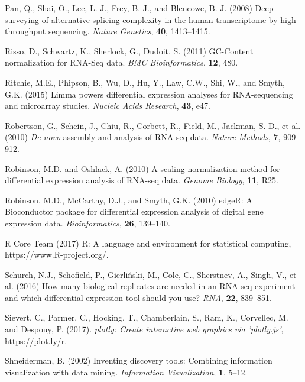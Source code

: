\documentclass{bioinfo}
\begin{document}
\begin{thebibliography}{}
Pan, Q., Shai, O., Lee, L. J., Frey, B. J., and Blencowe, B. J. (2008) Deep surveying of alternative splicing complexity in the human transcriptome by high-throughput sequencing. {\it Nature Genetics}, {\bf 40}, 1413--1415.

Risso, D., Schwartz, K., Sherlock, G., Dudoit, S. (2011) GC-Content normalization for RNA-Seq data. {\it BMC Bioinformatics}, {\bf 12}, 480.

Ritchie, M.E., Phipson, B., Wu, D., Hu, Y., Law, C.W., Shi, W., and Smyth, G.K. (2015) Limma powers differential expression analyses for RNA-sequencing and microarray studies. {\it Nucleic Acids Research}, {\bf 43}, e47.

Robertson, G., Schein, J., Chiu, R., Corbett, R., Field, M., Jackman, S. D., et al. (2010) \textit{De novo} assembly and analysis of RNA-seq data. {\it Nature Methods}, {\bf 7}, 909--912.

Robinson, M.D. and Oshlack, A. (2010) A scaling normalization method for differential expression analysis of RNA-seq data. {\it Genome Biology}, {\bf 11}, R25.

Robinson, M.D., McCarthy, D.J., and Smyth, G.K. (2010) edgeR: A Bioconductor package for differential expression analysis of digital gene expression data. {\it Bioinformatics}, {\bf 26}, 139--140.

R Core Team (2017) R: A language and environment for statistical computing, https://www.R-project.org/.

Schurch, N.J., Schofield, P., Gierliński, M., Cole, C., Sherstnev, A., Singh, V., et al. (2016) How many biological replicates are needed in an RNA-seq experiment and which differential expression tool should you use? {\it RNA}, {\bf 22}, 839--851.

Sievert, C., Parmer, C., Hocking, T., Chamberlain, S., Ram, K., Corvellec, M. and Despouy, P. (2017). {\it plotly: Create interactive web graphics via 'plotly.js'}, https://plot.ly/r.

Shneiderman, B. (2002) Inventing discovery tools: Combining information visualization with data mining. {\it Information Visualization}, {\bf 1}, 5--12.


\end{thebibliography}
\end{document}
